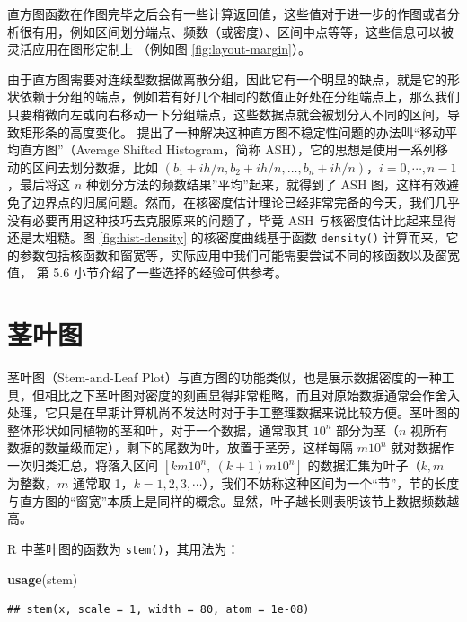 \documentclass[
  b5paper,
  UTF8,twoside]{book}
\newenvironment{Shaded}{\begin{snugshade}}{\end{snugshade}}
\newcommand{\FunctionTok}[1]{\textcolor[rgb]{0.13,0.29,0.53}{\textbf{#1}}}
\newcommand{\NormalTok}[1]{#1}
\begin{document}
直方图函数在作图完毕之后会有一些计算返回值，这些值对于进一步的作图或者分析很有用，例如区间划分端点、频数（或密度）、区间中点等等，这些信息可以被灵活应用在图形定制上
（例如图 \ref{fig:layout-margin}）。

由于直方图需要对连续型数据做离散分组，因此它有一个明显的缺点，就是它的形状依赖于分组的端点，例如若有好几个相同的数值正好处在分组端点上，那么我们只要稍微向左或向右移动一下分组端点，这些数据点就会被划分入不同的区间，导致矩形条的高度变化。\citet{Scott92} 提出了一种解决这种直方图不稳定性问题的办法叫``移动平均直方图''（Average Shifted Histogram，简称 ASH），它的思想是使用一系列移动的区间去划分数据，比如 \((b_1+ih/n,b_2+ih/n,\ldots,b_n+ih/n)\)，\(i=0,\cdots,n-1\)，最后将这 \(n\) 种划分方法的频数结果''平均''起来，就得到了 ASH 图，这样有效避免了边界点的归属问题。然而，在核密度估计理论已经非常完备的今天，我们几乎没有必要再用这种技巧去克服原来的问题了，毕竟 ASH 与核密度估计比起来显得还是太粗糙。图 \ref{fig:hist-density} 的核密度曲线基于函数 \texttt{density()} 计算而来，它的参数包括核函数和窗宽等，实际应用中我们可能需要尝试不同的核函数以及窗宽值，\citet{Venables02} 第 5.6 小节介绍了一些选择的经验可供参考。

\section{茎叶图}\label{ux830eux53f6ux56fe}

茎叶图（Stem-and-Leaf Plot）与直方图的功能类似，也是展示数据密度的一种工具，但相比之下茎叶图对密度的刻画显得非常粗略，而且对原始数据通常会作舍入处理，它只是在早期计算机尚不发达时对于手工整理数据来说比较方便。茎叶图的整体形状如同植物的茎和叶，对于一个数据，通常取其 \(10^n\) 部分为茎（\(n\) 视所有数据的数量级而定），剩下的尾数为叶，放置于茎旁，这样每隔 \(m10^n\) 就对数据作一次归类汇总，将落入区间 \([km10^{n},\ (k+1)m10^{n}]\) 的数据汇集为叶子（\(k,m\) 为整数，\(m\) 通常取 1，\(k=1,2,3,\cdots\)），我们不妨称这种区间为一个``节''，节的长度与直方图的``窗宽''本质上是同样的概念。显然，叶子越长则表明该节上数据频数越高。

R 中茎叶图的函数为 \texttt{stem()}，其用法为：

\begin{Shaded}
\begin{Highlighting}[]
\FunctionTok{usage}\NormalTok{(stem)}
\end{Highlighting}
\end{Shaded}

\begin{verbatim}
## stem(x, scale = 1, width = 80, atom = 1e-08)
\end{verbatim}
\end{document}
